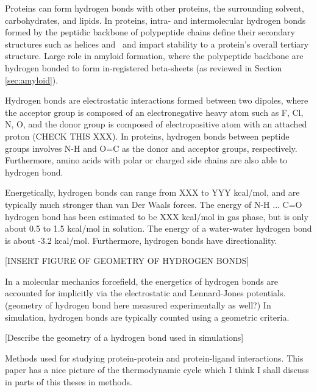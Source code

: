 Proteins can form hydrogen bonds with other proteins, the surrounding solvent, carbohydrates, and lipids. In proteins, intra- and intermolecular hydrogen bonds formed by the peptidic backbone of polypeptide chains define their secondary structures such as helices and \bsheets\, and impart stability to a protein's overall tertiary structure.\cite{refs}  Large role in amyloid formation, where the polypeptide backbone are hydrogen bonded to form in-registered beta-sheets (as reviewed in Section \ref{sec:amyloid}).

Hydrogen bonds are electrostatic interactions formed between two dipoles, where the acceptor group is composed of an electronegative heavy atom such as F, Cl, N, O, and the donor group is composed of electropositive atom with an attached proton (CHECK THIS XXX).  In proteins, hydrogen bonds between peptide groups involves N-H and O=C as the donor and acceptor groups, respectively. Furthermore, amino acids with polar or charged side chains are also able to hydrogen bond. 

Energetically, hydrogen bonds can range from XXX to YYY kcal/mol, and are typically much stronger than van Der Waals forces.  The energy of N-H ... C=O hydrogen bond has been estimated to be XXX kcal/mol in gas phase, but is only about 0.5 to 1.5 kcal/mol in solution.\cite{energetics of hydrogen bonds in peptides} The energy of a water-water hydrogen bond is about -3.2 kcal/mol.\cite{where did I see this}
Furthermore, hydrogen bonds have directionality.

[INSERT FIGURE OF GEOMETRY OF HYDROGEN BONDS]


In a molecular mechanics forcefield, the energetics of hydrogen bonds are accounted for implicitly via the electrostatic and Lennard-Jones potentials. (geometry of hydrogen bond here measured experimentally as well?) In simulation, hydrogen bonds are typically counted using a geometric criteria.

[Describe the geometry of a hydrogen bond used in simulations] 

Methods used for studying protein-protein and protein-ligand interactions.\cite{Wang:2001ez}
This paper\cite{Durrant:2011bm} has a nice picture of the thermodynamic cycle which I think I shall discuss in parts of this theses in methods.


